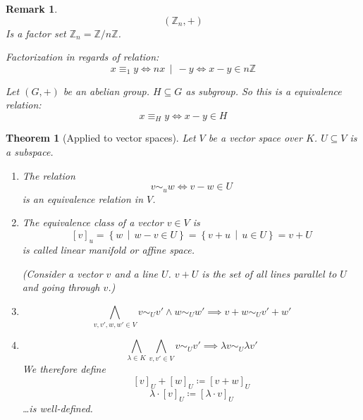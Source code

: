 \documentclass[a4paper,landscape,twocolumn]{article}
\newcommand\setdef[2]{\left\{#1\,\middle|\,#2\right\}}
\newcommand\divides[2]{#1\,\mid\,#2}
\newtheorem{theorem}{Theorem}[section]
\newtheorem{rem}{Remark}[section]
\begin{document}
\begin{rem}
  \[ \left(\mathbb Z_n, +\right) \]
  Is a factor set $\mathbb Z_n = \mathbb Z / n\mathbb Z$.

  Factorization in regards of relation:
  \[ x \equiv_1 y \iff n \divides x - y \iff x-y \in n\mathbb Z \]

  Let $(G, +)$ be an abelian group. $H \subseteq G$ as subgroup.
  So this is a equivalence relation:
  \[ x \equiv_H y \iff x - y \in H \]
\end{rem}

\begin{theorem}[Applied to vector spaces]
  \label{satz-4-21}
  Let $V$ be a vector space over $K$. $U \subseteq V$ is a subspace.

  \begin{enumerate}
    \item
      The relation
      \[ v \sim_u w \iff v - w \in U \]
      is an equivalence relation in $V$.
    \item
      The equivalence class of a vector $v \in V$ is
      \[ [v]_u = \setdef{w}{w -v \in U} = \setdef{v+u}{u \in U} = v + U \]
      is called \emph{linear manifold} or \emph{affine space}.

      (Consider a vector $v$ and a line $U$. $v + U$ is the set of all lines parallel to $U$ and going through $v$.)
    \item
      \[ \bigwedge_{v,v',w,w' \in V} v \sim_U v' \land w \sim_U w' \implies v+w \sim_U v' + w' \]
    \item
      \[ \bigwedge_{\lambda \in K} \bigwedge_{v,v' \in V} v \sim_U v' \implies \lambda v \sim_U \lambda v' \]
      We therefore define
      \[ [v]_U + [w]_U \coloneqq [v + w]_U \]
      \[ \lambda \cdot [v]_U \coloneqq [\lambda \cdot v]_U \]
      \dots is well-defined.
  \end{enumerate}
\end{theorem}
\end{document}
